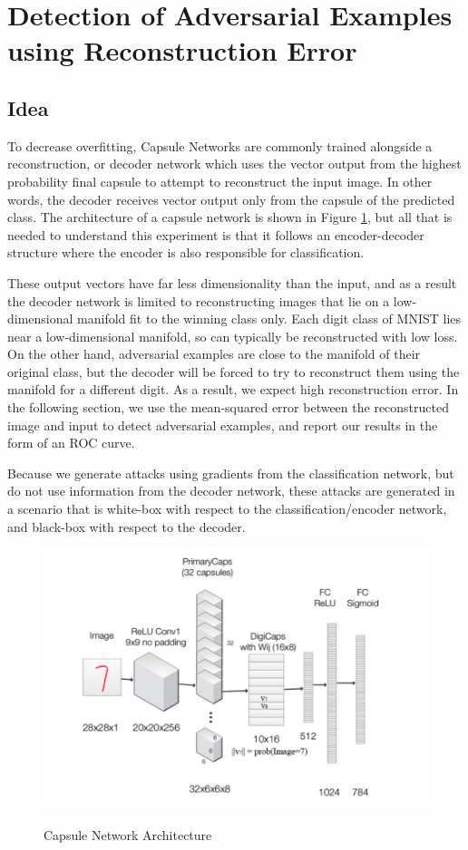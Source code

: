 \documentclass{asaproc}
\begin{document}
\section*{Detection of Adversarial Examples using Reconstruction Error}

\subsection*{Idea}

To decrease overfitting, Capsule Networks are commonly trained alongside a reconstruction, or decoder network which uses the vector output from the highest probability final capsule to attempt to reconstruct the input image. In other words, the decoder receives vector output only from the capsule of the predicted class. The architecture of a capsule network is shown in Figure \ref{fig9}, but all that is needed to understand this experiment is that it follows an encoder-decoder structure where the encoder is also responsible for classification.

These output vectors have far less dimensionality than the input, and as a result the decoder network is limited to reconstructing images that lie on a low-dimensional manifold fit to the winning class only. Each digit class of MNIST lies near a low-dimensional manifold, so can typically be reconstructed with low loss. On the other hand, adversarial examples are close to the manifold of their original class, but the decoder will be forced to try to reconstruct them using the manifold for a different digit. As a result, we expect high reconstruction error. In the following section, we use the mean-squared error between the reconstructed image and input to detect adversarial examples, and report our results in the form of an ROC curve.

Because we generate attacks using gradients from the classification network, but do not use information from the decoder network, these attacks are generated in a scenario that is white-box with respect to the classification/encoder network, and black-box with respect to the decoder.

\begin{figure}[h!]
	\centering
	\caption{\enspace Capsule Network Architecture}
	\includegraphics[width=\linewidth]{caps_recon}
	\label{fig9}
\end{figure}
\end{document}
